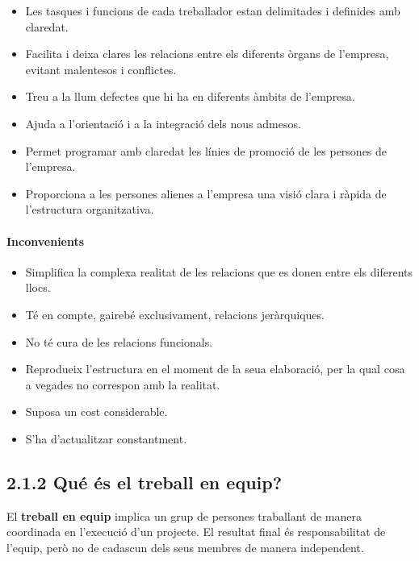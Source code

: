 \documentclass[
  a4paper,
  openany]{book}
\providecommand{\tightlist}{%
  \setlength{\itemsep}{0pt}\setlength{\parskip}{0pt}}
\begin{document}
\begin{itemize}
\tightlist
\item
  Les tasques i funcions de cada treballador estan delimitades i definides amb claredat.
\item
  Facilita i deixa clares les relacions entre els diferents òrgans de l'empresa, evitant malentesos i conflictes.
\item
  Treu a la llum defectes que hi ha en diferents àmbits de l'empresa.
\item
  Ajuda a l'orientació i a la integració dels nous admesos.
\item
  Permet programar amb claredat les línies de promoció de les persones de l'empresa.
\item
  Proporciona a les persones alienes a l'empresa una visió clara i ràpida de l'estructura organitzativa.
\end{itemize}

\hypertarget{inconvenients}{%
\paragraph{Inconvenients}\label{inconvenients}}

\begin{itemize}
\tightlist
\item
  Simplifica la complexa realitat de les relacions que es donen entre els diferents llocs.
\item
  Té en compte, gairebé exclusivament, relacions jeràrquiques.
\item
  No té cura de les relacions funcionals.
\item
  Reprodueix l'estructura en el moment de la seua elaboració, per la qual cosa a vegades no correspon amb la realitat.
\item
  Suposa un cost considerable.
\item
  S'ha d'actualitzar constantment.
\end{itemize}

\hypertarget{quuxe9-uxe9s-el-treball-en-equip}{%
\subsection{2.1.2 Qué és el treball en equip?}\label{quuxe9-uxe9s-el-treball-en-equip}}

El \textbf{treball en equip} implica un grup de persones traballant de manera coordinada en l'execució d'un projecte. El resultat final és responsabilitat de l'equip, però no de cadascun dels seus membres de manera independent.
\end{document}
